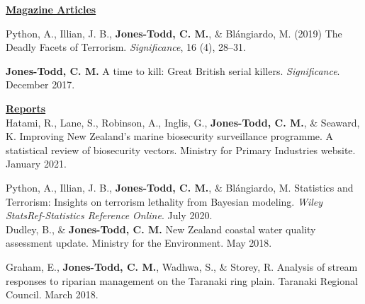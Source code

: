 \documentclass[10pt,a4paper]{moderncv}
\begin{document}



 
 
\underline{\textbf{Magazine Articles}}\\

\vspace{-3pt}

Python, A.,  Illian, J. B., \textbf{Jones-Todd, C. M.}, \& Bl\'{a}ngiardo, M. (2019) The Deadly Facets of Terrorism. \textit{Significance}, 16 (4), 28--31.\\

\vspace{-3pt}

\textbf{Jones-Todd, C. M.} A time to kill: Great British serial killers. \textit{Significance}. December 2017.\\

\vspace{2pt} 

\underline{\textbf{Reports}}\\

Hatami, R., Lane, S., Robinson, A.,  Inglis, G.,  \textbf{Jones-Todd, C. M.}, \& Seaward, K. Improving New Zealand’s marine biosecurity surveillance programme. A statistical review of biosecurity vectors.  Ministry for Primary Industries website. January 2021.\\

\vspace{-3pt}

Python, A.,  Illian, J. B., \textbf{Jones-Todd, C. M.}, \& Bl\'{a}ngiardo, M. Statistics and Terrorism: Insights on terrorism lethality from Bayesian modeling. \textit{Wiley StatsRef-Statistics Reference Online}. July 2020.\\

Dudley, B., \& \textbf{Jones-Todd, C. M.} New Zealand coastal water quality assessment update. Ministry for the Environment. May 2018.\\

\vspace{-3pt}

Graham, E., \textbf{Jones-Todd, C. M.}, Wadhwa, S., \& Storey, R. Analysis of stream responses to riparian management on the Taranaki ring plain. Taranaki Regional Council. March 2018.\\
\end{document}
